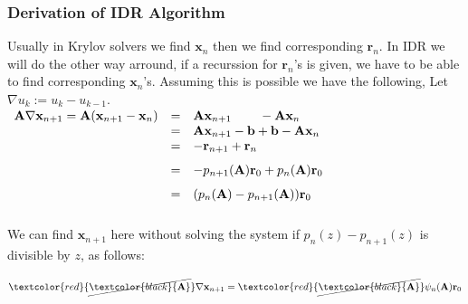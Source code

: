 \documentclass[mathserif]{beamer}
\begin{document}
\begin{frame}
\frametitle{Derivation of IDR Algorithm}

Usually in Krylov solvers we find $\mathbf{x}_n$ then we find corresponding $\mathbf{r}_n$. In IDR we will do the other way arround, if a recurssion for $\mathbf{r}_n$'s is given, we have to be able to find corresponding $\mathbf{x}_n$'s. \pause Assuming this is possible we have the following, Let $\nabla u_k:=u_k-u_{k-1}.$\\


\vspace{.1in}
$\begin{array} {lclcl} \mathbf{A}\nabla \mathbf{x}_{n+1}=\mathbf{A}(\mathbf{x}_{n+1}-\mathbf{x}_n)  & = & \mathbf{A}\mathbf{x}_{n+1} \hspace{.3in} -\mathbf{A}\mathbf{x}_n \\ & = & \mathbf{A}\mathbf{x}_{n+1}-\mathbf{b}+\mathbf{b} -\mathbf{A}\mathbf{x}_n \\&=& \vspace{.1in} -\mathbf{r}_{n+1}+\mathbf{r}_n \\&=& \vspace{.1in} -p_{n+1}(\mathbf{A})\mathbf{r}_0+p_n(\mathbf{A})\mathbf{r}_0 \\&=& \vspace{.1in} (p_n(\mathbf{A})-p_{n+1}(\mathbf{A}))\mathbf{r}_0\end{array}$


\pause
We can find $\mathbf{x}_{n+1}$ here without solving the system if $p_n(z)-p_{n+1}(z)$ is divisible by $z$, as follows:

\pause
\begin{center}
$ \textcolor{red}{\cancel{\textcolor{black}{\mathbf{A}}}} \nabla \mathbf{x}_{n+1} = \textcolor{red}{\cancel{\textcolor{black}{\mathbf{A}}}} \psi_n(\mathbf{A})\mathbf{r}_0 $

\end{center}

\end{frame}
\end{document}
